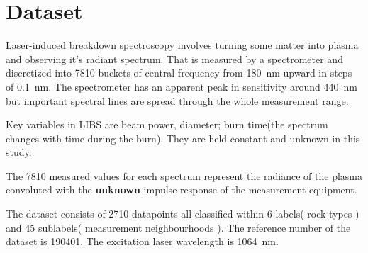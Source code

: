 \documentclass{article}
\begin{document}
\section{Dataset}
Laser-induced breakdown spectroscopy\cite{libs_intro} involves turning some matter into plasma and observing it's radiant spectrum.
That is measured by a spectrometer and discretized into 7810 buckets of central frequency from  \SI{180}{\nano\metre} upward in steps of \SI{0.1}{\nano\metre}.
The spectrometer has an apparent peak in sensitivity around \SI{440}{\nano\metre} but important spectral lines are spread through the whole measurement range.
\par
Key variables in LIBS are beam power, diameter; burn time(the spectrum changes with time during the burn).
They are held constant and unknown in this study.
\par
The 7810 measured values for each spectrum represent the radiance\cite{radiance} of the plasma convoluted with the \textbf{unknown} impulse response of the measurement equipment.
\par
The dataset consists of 2710 datapoints all classified within 6 labels( rock types ) and 45 sublabels( measurement neighbourhoods ).
The reference number of the dataset is 190401.
The excitation laser wavelength is \SI{1064}{\nano\metre}.
\end{document}
